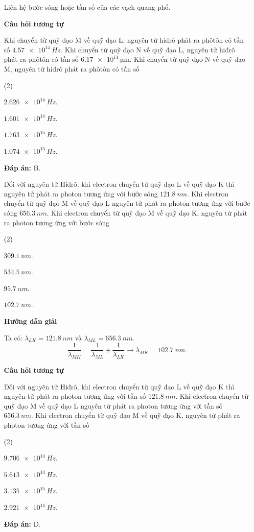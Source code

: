 \begin{dang}{Liên hệ bước sóng hoặc tần số của các vạch quang phổ.}
{\begin{center}
	\textbf{Câu hỏi tương tự}
\end{center}

Khi chuyển từ quỹ đạo M về quỹ đạo L, nguyên tử hiđrô phát ra phôtôn có tần số $ \SI{4,57 e14}{Hz} $. Khi chuyển từ quỹ đạo N về quỹ đạo L, nguyên tử hiđrô phát ra phôtôn có tần số $\SI{6,17 e14}{\micro \meter}$. Khi chuyển từ quỹ đạo N về quỹ đạo M, nguyên tử hiđrô phát ra phôtôn có tần số
\begin{mcq}(2)
	\item $ \SI{2,626 e14}{Hz} $.
	\item $ \SI{1,601 e14}{Hz} $.
	\item $ \SI{1,763 e15}{Hz} $.
	\item $ \SI{1,074 e15}{Hz} $.
\end{mcq}

\textbf{Đáp án:} B.}

{
Đối với nguyên tử Hiđrô, khi electron chuyển từ quỹ đạo L về quỹ đạo K thì nguyên tử phát ra photon tương ứng với bước sóng $ \SI{121,8}{nm} $. Khi electron chuyển từ quỹ đạo M về quỹ đạo L nguyên tử phát ra photon tương ứng với bước sóng $ \SI{656,3}{nm} $. Khi electron chuyển từ quỹ đạo M về quỹ đạo K, nguyên tử phát ra photon tương ứng với bước sóng
\begin{mcq}(2)
	\item $ \SI{309,1}{nm} $.
	\item $ \SI{534,5}{nm} $.
	\item $ \SI{95,7}{nm} $.
	\item $ \SI{102,7}{nm} $.
\end{mcq}
}
{
\begin{center}
	\textbf{Hướng dẫn giải}
\end{center}
Ta có: $ \lambda_{LK} = \SI{121,8}{nm} $ và $ \lambda_{ML} = \SI{656,3}{nm} $. \\
$$
	\dfrac{1}{\lambda_{MK}} = \dfrac{1}{\lambda_{ML}} + \dfrac{1}{\lambda_{LK}} \rightarrow \lambda_{MK} = \SI{102,7}{nm}.
$$
\begin{center}
	\textbf{Câu hỏi tương tự}
\end{center}
Đối với nguyên tử Hiđrô, khi electron chuyển từ quỹ đạo L về quỹ đạo K thì nguyên tử phát ra photon tương ứng với tần số $ \SI{121,8}{nm} $. Khi electron chuyển từ quỹ đạo M về quỹ đạo L nguyên tử phát ra photon tương ứng với tần số $ \SI{656,3}{nm} $. Khi electron chuyển từ quỹ đạo M về quỹ đạo K, nguyên tử phát ra photon tương ứng với tần số
\begin{mcq}(2)
	\item $ \SI{9,706 e14}{Hz} $.
	\item $ \SI{5,613 e14}{Hz} $.
	\item $ \SI{3,135 e15}{Hz} $.
	\item $ \SI{2,921 e14}{Hz} $.
\end{mcq}
\textbf{Đáp án:} D.
}

\end{dang}